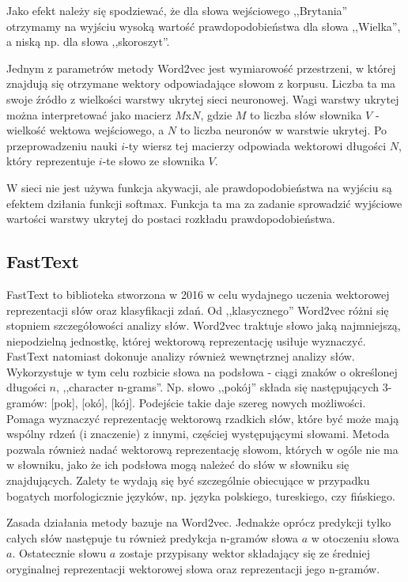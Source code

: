 \documentclass[pl]{minipw} %
\begin{document}
Jako efekt należy się spodziewać, że dla słowa wejściowego ,,Brytania'' otrzymamy na wyjściu wysoką wartość prawdopodobieństwa dla słowa ,,Wielka'', a niską np. dla słowa ,,skoroszyt''.

Jednym z parametrów metody Word2vec jest wymiarowość przestrzeni, w której znajdują się otrzymane wektory odpowiadające słowom z korpusu. Liczba ta ma swoje źródło z wielkości warstwy ukrytej sieci neuronowej. Wagi warstwy ukrytej można interpretować jako macierz $M$x$N$, gdzie $M$ to liczba słów słownika $V$ - wielkość wektowa wejściowego, a $N$ to liczba neuronów w warstwie ukrytej. Po przeprowadzeniu nauki $i$-ty wiersz tej macierzy odpowiada wektorowi długości $N$, który reprezentuje $i$-te słowo ze słownika $V$.

W sieci nie jest używa funkcja akywacji, ale prawdopodobieństwa na wyjściu są efektem dziłania funkcji softmax. Funkcja ta ma za zadanie sprowadzić wyjściowe wartości warstwy ukrytej do postaci rozkładu prawdopodobieństwa. 


\subsection{FastText}

FastText\cite{fasttext} to biblioteka stworzona w 2016 w celu wydajnego uczenia wektorowej reprezentacji słów oraz klasyfikacji zdań. Od ,,klasycznego'' Word2vec różni się stopniem szczegółowości analizy słów. Word2vec traktuje słowo jaką najmniejszą, niepodzielną jednostkę, której wektorową reprezentację usiłuje wyznaczyć. FastText natomiast dokonuje analizy również wewnętrznej analizy słów. Wykorzystuje w tym celu rozbicie słowa na podsłowa - ciągi znaków o określonej długości $n$, ,,character n-grams''. Np. słowo ,,pokój'' składa się następujących 3-gramów: [pok], [okó], [kój]. Podejście takie daje szereg nowych możliwości. Pomaga wyznaczyć reprezentację wektorową rzadkich słów, które być może mają wspólny rdzeń (i znaczenie) z innymi, częściej występującymi słowami. Metoda pozwala również nadać wektorową reprezentację słowom, których w ogóle nie ma w słowniku, jako że ich podsłowa mogą należeć do słów w słowniku się znajdujących. Zalety te wydają się być szczególnie obiecujące w przypadku bogatych morfologicznie języków, np. języka polskiego, tureskiego, czy fińskiego.

Zasada działania metody bazuje na Word2vec. Jednakże oprócz predykcji tylko całych słów następuje tu również predykcja n-gramów słowa $a$ w otoczeniu słowa $a$. Ostatecznie słowu $a$ zostaje przypisany wektor składający się ze średniej oryginalnej reprezentacji wektorowej słowa oraz reprezentacji jego n-gramów.
\end{document}
